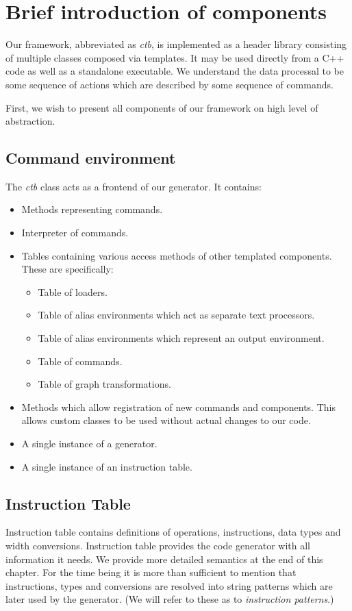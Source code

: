 \section{Brief introduction of components}

Our framework, abbreviated as \emph{ctb}, is implemented as a header library consisting of multiple classes composed via templates. It may be used directly from a C++ code as well as a standalone executable. We understand the data processal to be some sequence of actions which are described by some sequence of commands. 

First, we wish to present all components of our framework on high level of abstraction.

\subsection*{Command environment}
  The \emph{ctb} class acts as a frontend of our generator. It contains:
  \begin{itemize}
    \item Methods representing commands.
    \item Interpreter of commands.
    \item Tables containing various access methods of other templated components. These are specifically:
    \begin{itemize}
      \item Table of loaders.
      \item Table of alias environments which act as separate text processors.
      \item Table of alias environments which represent an output environment.
      \item Table of commands.
      \item Table of graph transformations.
    \end{itemize}
    \item Methods which allow registration of new commands and components. This allows custom classes to be used without actual changes to our code.
    \item A single instance of a generator.
    \item A single instance of an instruction table.
  \end{itemize}

\subsection*{Instruction Table} 
  Instruction table contains definitions of operations, instructions, data types and width conversions. Instruction table provides the code generator with all information it needs. We provide more detailed semantics at the end of this chapter. For the time being it is more than sufficient to mention that instructions, types and conversions are resolved into string patterns which are later used by the generator. (We will refer to these as to \emph{instruction patterns}.)

